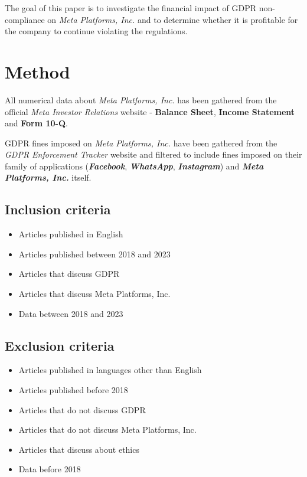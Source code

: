 \documentclass[12pt, a4paper]{article}
\begin{document}
The goal of this paper is to investigate the financial impact of GDPR
non-compliance on \textit{Meta Platforms, Inc.} and to determine whether it is
profitable for the company to continue violating the regulations.

\section*{Method}

All numerical data about \textit{Meta Platforms, Inc.} has been gathered from
the official \textit{Meta Investor Relations} website\cite{fbMetaFinancials} -
\textbf{Balance Sheet}, \textbf{Income Statement} and \textbf{Form 10-Q}.

GDPR fines imposed on \textit{Meta Platforms, Inc.} have been gathered from the
\textit{GDPR Enforcement Tracker}
website\cite{enforcementtrackerGDPREnforcement} and filtered to include fines
imposed on their family of applications (\textbf{\textit{Facebook}},
\textbf{\textit{WhatsApp}}, \textbf{\textit{Instagram}}) and
\textbf{\textit{Meta Platforms, Inc.}} itself.

\subsection*{Inclusion criteria}

\begin{itemize}
    \item Articles published in English
    \item Articles published between 2018 and 2023
    \item Articles that discuss GDPR
    \item Articles that discuss Meta Platforms, Inc.
    \item Data between 2018 and 2023
\end{itemize}

\subsection*{Exclusion criteria}

\begin{itemize}
    \item Articles published in languages other than English
    \item Articles published before 2018
    \item Articles that do not discuss GDPR
    \item Articles that do not discuss Meta Platforms, Inc.
    \item Articles that discuss about ethics
    \item Data before 2018
\end{itemize}
\end{document}
